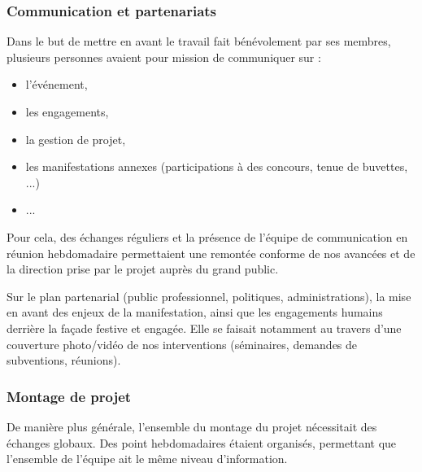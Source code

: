 \documentclass[12pt,a4paper,draft]{report}
\begin{document}
\subsubsection{Communication et partenariats}
Dans le but de mettre en avant le travail fait bénévolement par ses membres, plusieurs personnes avaient pour mission de communiquer sur :
\begin{itemize}
\item l'événement,
\item les engagements,
\item la gestion de projet,
\item les manifestations annexes (participations à des concours, tenue de buvettes, ...)
\item ...
\end{itemize}

Pour cela, des échanges réguliers et la présence de l'équipe de communication en réunion hebdomadaire permettaient une remontée conforme de nos avancées et de la direction prise par le projet auprès du grand public.

Sur le plan partenarial (public professionnel, politiques, administrations), la mise en avant des enjeux de la manifestation, ainsi que les engagements humains derrière la façade festive et engagée. Elle se faisait notamment au travers d'une couverture photo/vidéo de nos interventions (séminaires, demandes de subventions, réunions).


\subsubsection{Montage de projet}
De manière plus générale, l'ensemble du montage du projet nécessitait des échanges globaux. Des point hebdomadaires étaient organisés, permettant que l'ensemble de l'équipe ait le même niveau d'information.
\end{document}
